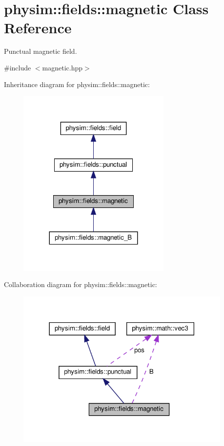 \hypertarget{classphysim_1_1fields_1_1magnetic}{}\section{physim\+:\+:fields\+:\+:magnetic Class Reference}
\label{classphysim_1_1fields_1_1magnetic}


Punctual magnetic field.  




{\ttfamily \#include $<$magnetic.\+hpp$>$}



Inheritance diagram for physim\+:\+:fields\+:\+:magnetic\+:\nopagebreak
\begin{figure}[H]
\begin{center}
\leavevmode
\includegraphics[width=215pt]{classphysim_1_1fields_1_1magnetic__inherit__graph}
\end{center}
\end{figure}


Collaboration diagram for physim\+:\+:fields\+:\+:magnetic\+:\nopagebreak
\begin{figure}[H]
\begin{center}
\leavevmode
\includegraphics[width=302pt]{classphysim_1_1fields_1_1magnetic__coll__graph}
\end{center}
\end{figure}
